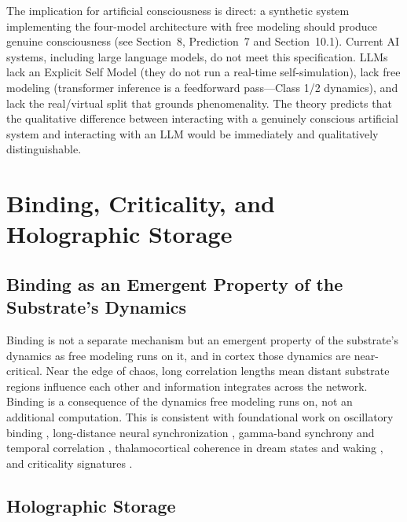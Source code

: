\documentclass[12pt]{article}
\begin{document}
The implication for artificial consciousness is direct: a synthetic system implementing the four-model architecture with free modeling should produce genuine consciousness (see Section~8, Prediction~7 and Section~10.1). Current AI systems, including large language models, do not meet this specification. LLMs lack an Explicit Self Model (they do not run a real-time self-simulation), lack free modeling (transformer inference is a feedforward pass---\hspace{0pt}Class 1/2 dynamics), and lack the real/virtual split that grounds phenomenality. The theory predicts that the qualitative difference between interacting with a genuinely conscious artificial system and interacting with an LLM would be immediately and qualitatively distinguishable.



\section{Binding, Criticality, and Holographic Storage}


\subsection{Binding as an Emergent Property of the Substrate's Dynamics}

Binding is not a separate mechanism but an emergent property of the substrate's dynamics as free modeling runs on it, and in cortex those dynamics are near-critical. Near the edge of chaos, long correlation lengths mean distant substrate regions influence each other and information integrates across the network. Binding is a consequence of the dynamics free modeling runs on, not an additional computation. This is consistent with foundational work on oscillatory binding \citep{Gray1989}, long-distance neural synchronization \citep{Rodriguez1999}, gamma-band synchrony and temporal correlation \citep{Singer1995,Fries2005,Fries2015}, thalamocortical coherence in dream states \citep{Llinas1993} and waking \citep{Llinas1998}, and criticality signatures \citep{Beggs2003,Tagliazucchi2012}.


\subsection{Holographic Storage}
\end{document}
